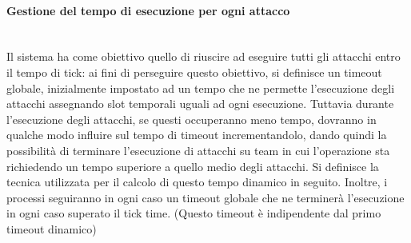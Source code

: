 \documentclass[11pt]{article}
\begin{document}
\paragraph{Gestione del tempo di esecuzione per ogni attacco}\mbox{}\\
Il sistema ha come obiettivo quello di riuscire ad eseguire tutti gli attacchi entro il tempo di tick: ai fini di perseguire questo obiettivo, si definisce un timeout globale, inizialmente impostato ad un tempo che ne permette l'esecuzione degli attacchi assegnando slot temporali uguali ad ogni esecuzione. Tuttavia durante l'esecuzione degli attacchi, se questi occuperanno meno tempo, dovranno in qualche modo influire sul tempo di timeout incrementandolo, dando quindi la possibilità di terminare l'esecuzione di attacchi su team in cui l'operazione sta richiedendo un tempo superiore a quello medio degli attacchi. Si definisce la tecnica utilizzata per il calcolo di questo tempo dinamico in seguito.
Inoltre, i processi seguiranno in ogni caso un timeout globale che ne terminerà l'esecuzione in ogni caso superato il tick time. (Questo timeout è indipendente dal primo timeout dinamico)
\end{document}
